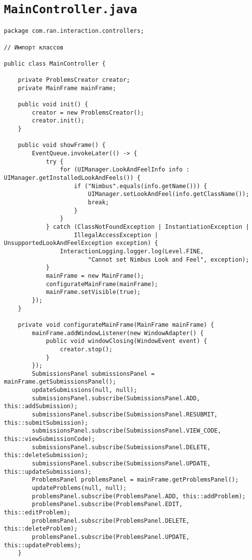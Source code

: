 \section*{\texttt{MainController.java}}
\begin{verbatim}
package com.ran.interaction.controllers;

// Импорт классов

public class MainController {

    private ProblemsCreator creator;
    private MainFrame mainFrame;

    public void init() {
        creator = new ProblemsCreator();
        creator.init();
    }
    
    public void showFrame() {
        EventQueue.invokeLater(() -> {
            try {
                for (UIManager.LookAndFeelInfo info : UIManager.getInstalledLookAndFeels()) {
                    if ("Nimbus".equals(info.getName())) {
                        UIManager.setLookAndFeel(info.getClassName());
                        break;
                    }
                }
            } catch (ClassNotFoundException | InstantiationException |
                    IllegalAccessException | UnsupportedLookAndFeelException exception) {
                InteractionLogging.logger.log(Level.FINE,
                        "Cannot set Nimbus Look and Feel", exception);
            }
            mainFrame = new MainFrame();
            configurateMainFrame(mainFrame);
            mainFrame.setVisible(true);
        });
    }

    private void configurateMainFrame(MainFrame mainFrame) {
        mainFrame.addWindowListener(new WindowAdapter() {
            public void windowClosing(WindowEvent event) {
                creator.stop();
            }
        });
        SubmissionsPanel submissionsPanel = mainFrame.getSubmissionsPanel();
        updateSubmissions(null, null);
        submissionsPanel.subscribe(SubmissionsPanel.ADD, this::addSubmission);
        submissionsPanel.subscribe(SubmissionsPanel.RESUBMIT, this::submitSubmission);
        submissionsPanel.subscribe(SubmissionsPanel.VIEW_CODE, this::viewSubmissionCode);
        submissionsPanel.subscribe(SubmissionsPanel.DELETE, this::deleteSubmission);
        submissionsPanel.subscribe(SubmissionsPanel.UPDATE, this::updateSubmissions);
        ProblemsPanel problemsPanel = mainFrame.getProblemsPanel();
        updateProblems(null, null);
        problemsPanel.subscribe(ProblemsPanel.ADD, this::addProblem);
        problemsPanel.subscribe(ProblemsPanel.EDIT, this::editProblem);
        problemsPanel.subscribe(ProblemsPanel.DELETE, this::deleteProblem);
        problemsPanel.subscribe(ProblemsPanel.UPDATE, this::updateProblems);
    }
    

\end{verbatim}
